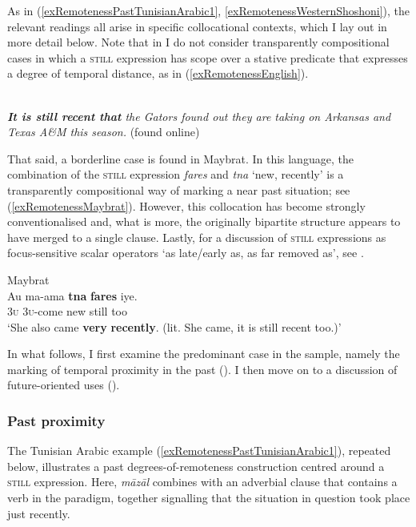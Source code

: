 As in (\ref{exRemotenessPastTunisianArabic1}, \ref{exRemotenessWesternShoshoni}), the relevant readings all arise in specific collocational contexts, which I lay out in more detail below. Note that in I do not consider transparently compositional cases in which a \textsc{still} expression has scope over a stative predicate that expresses a degree of temporal distance, as in (\ref{exRemotenessEnglish}).

\begin{exe}
	\ex {}\label{exRemotenessEnglish}\\
	\textit{\textbf{It is still recent that} the Gators found out they are taking on Arkansas and Texas A\&{}M this season.} (found online)%
\end{exe}

That said, a borderline case is found in Maybrat. In this language,  the combination of the \textsc{still} expression \textit{fares} and \textit{tna} \lq new, recently' is a transparently compositional way of marking a near past situation; see (\ref{exRemotenessMaybrat}). However, this collocation has become strongly conventionalised and, what is more, the originally bipartite structure appears to have merged to a single clause. Lastly, for a discussion of \textsc{still} expressions as focus-sensitive scalar operators \lq as late/early as, as far removed as\rq{}, see .
 
\begin{exe}	
	\ex Maybrat\label{exRemotenessMaybrat}\\
	\gll Au ma-ama \textbf{tna} \textbf{fares} iye.\\
	3\textsc{u} 3\textsc{u}-come new still too\\
	\glt \lq She also came \textbf{very} \textbf{recently}. (lit. She came, it is still recent too.)'\\\parencite[164]{Dol2007}
\end{exe}

In what follows, I first examine the predominant case in the sample, namely the marking of temporal proximity in the past (). I then move on to a discussion of future-oriented uses ().

\subsubsection{Past proximity}
\label{sectionRemotenessPast}
 The Tunisian Arabic example (\ref{exRemotenessPastTunisianArabic1}), repeated below, illustrates a past degrees-of-remoteness construction centred around a \textsc{still} expression. Here, \textit{māzāl} combines with an adverbial clause that contains a verb in the   paradigm, together signalling that the situation in question took place just recently.

